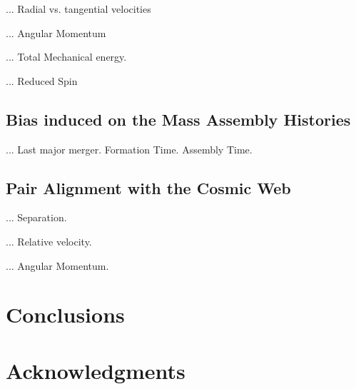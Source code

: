 \documentclass[usenatbib]{latex/mn2e}
\begin{document}
... Radial vs. tangential velocities

... Angular Momentum

... Total Mechanical energy.

... Reduced Spin


\subsection{Bias induced on the Mass Assembly Histories}
\label{subsec:bias_MAH}

... Last major merger. Formation Time. Assembly Time.

\subsection{Pair Alignment with the Cosmic Web}
\label{subsec:alignment_cosmic_web}

... Separation.

... Relative velocity.

... Angular Momentum.


\section{Conclusions}
\label{sec:conclusions}


\section*{Acknowledgments}  



 
\end{document}
